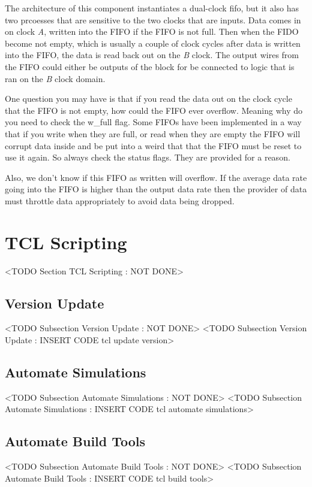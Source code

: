 The architecture of this component instantiates a dual-clock fifo, but it also has two prcoesses that are sensitive to the two clocks that are inputs. Data comes in on clock \emph{A}, written into the \ac{FIFO} if the \ac{FIFO} is not full. Then when the \ac{FIDO} become not empty, which is usually a couple of clock cycles after data is written into the \ac{FIFO}, the data is read back out on the \emph{B} clock. The output wires from the \ac{FIFO} could either be outputs of the block for be connected to logic that is ran on the \emph{B} clock domain. 

One question you may have is that if you read the data out on the clock cycle that the \ac{FIFO} is not empty, how could the \ac{FIFO} ever overflow. Meaning why do you need to check the w\_full flag. Some \ac{FIFO}s have been implemented in a way that if you write when they are full, or read when they are empty the \ac{FIFO} will corrupt data inside and be put into a weird that that the \ac{FIFO} must be reset to use it again. So always check the status flags. They are provided for a reason.

Also, we don't know if this \ac{FIFO} as written will overflow. If the average data rate going into the \ac{FIFO} is higher than the output data rate then the provider of data must throttle data appropriately to avoid data being dropped. 

	
\section{TCL Scripting}
	<TODO Section TCL Scripting : NOT DONE>

\subsection{Version Update}
	<TODO Subsection Version Update : NOT DONE>
	<TODO Subsection Version Update : INSERT CODE tcl update version>

\subsection{Automate Simulations}
	<TODO Subsection Automate Simulations : NOT DONE>
	<TODO Subsection Automate Simulations : INSERT CODE tcl automate simulations>

\subsection{Automate Build Tools}
	<TODO Subsection Automate Build Tools : NOT DONE>
	<TODO Subsection Automate Build Tools : INSERT CODE tcl build tools>

	
	
		
	